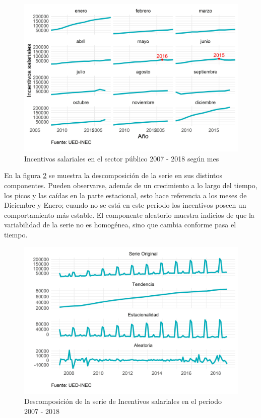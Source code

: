 \documentclass[
]{article}
\begin{document}
\begin{figure}[!h]
\includegraphics[width=1\linewidth,height=1\textheight]{Tesis_files/figure-latex/incentivosplotperiodos-1} \caption{Incentivos salariales en el sector público 2007 - 2018 según mes}\label{fig:incentivosplotperiodos}
\end{figure}

En la figura \ref{fig:incentivosplotdescomposicion} se muestra la
descomposición de la serie en sus distintos componentes. Pueden
observarse, además de un crecimiento a lo largo del tiempo, los picos y
las caídas en la parte estacional, esto hace referencia a los meses de
Diciembre y Enero; cuando no se está en este periodo los incentivos
poseen un comportamiento más estable. El componente aleatorio muestra
indicios de que la variabilidad de la serie no es homogénea, sino que
cambia conforme pasa el tiempo.

\begin{figure}[!h]
\includegraphics[width=1\linewidth,height=1\textheight]{Tesis_files/figure-latex/incentivosplotdescomposicion-1} \caption{Descomposición de la serie de Incentivos salariales en el periodo 2007 - 2018}\label{fig:incentivosplotdescomposicion}
\end{figure}
\end{document}
